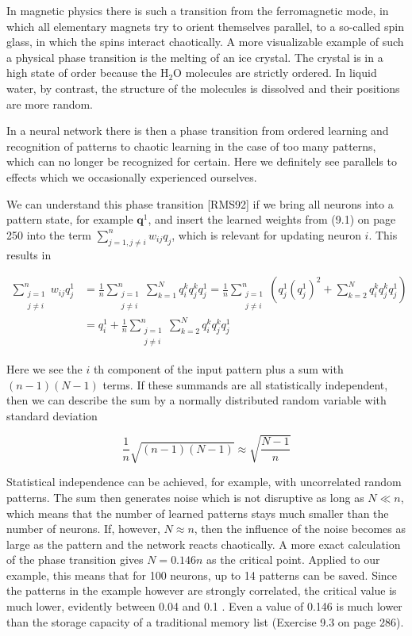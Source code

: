 \documentclass[10pt]{article}
\begin{document}
In magnetic physics there is such a transition from the ferromagnetic mode, in which all elementary magnets try to orient themselves parallel, to a so-called spin glass, in which the spins interact chaotically. A more visualizable example of such a physical phase transition is the melting of an ice crystal. The crystal is in a high state of order because the $\mathrm{H}_{2} \mathrm{O}$ molecules are strictly ordered. In liquid water, by contrast, the structure of the molecules is dissolved and their positions are more random.

In a neural network there is then a phase transition from ordered learning and recognition of patterns to chaotic learning in the case of too many patterns, which can no longer be recognized for certain. Here we definitely see parallels to effects which we occasionally experienced ourselves.

We can understand this phase transition [RMS92] if we bring all neurons into a pattern state, for example $\boldsymbol{q}^{1}$, and insert the learned weights from (9.1) on page 250 into the term $\sum_{j=1, j \neq i}^{n} w_{i j} q_{j}$, which is relevant for updating neuron $i$. This results in

$$
\begin{aligned}
\sum_{\substack{j=1 \\
j \neq i}}^{n} w_{i j} q_{j}^{1} & =\frac{1}{n} \sum_{\substack{j=1 \\
j \neq i}}^{n} \sum_{k=1}^{N} q_{i}^{k} q_{j}^{k} q_{j}^{1}=\frac{1}{n} \sum_{\substack{j=1 \\
j \neq i}}^{n}\left(q_{j}^{1}\left(q_{j}^{1}\right)^{2}+\sum_{k=2}^{N} q_{i}^{k} q_{j}^{k} q_{j}^{1}\right) \\
& =q_{i}^{1}+\frac{1}{n} \sum_{\substack{j=1 \\
j \neq i}}^{n} \sum_{k=2}^{N} q_{i}^{k} q_{j}^{k} q_{j}^{1}
\end{aligned}
$$

Here we see the $i$ th component of the input pattern plus a sum with $(n-1)(N-1)$ terms. If these summands are all statistically independent, then we can describe the sum by a normally distributed random variable with standard deviation

$$
\frac{1}{n} \sqrt{(n-1)(N-1)} \approx \sqrt{\frac{N-1}{n}}
$$

Statistical independence can be achieved, for example, with uncorrelated random patterns. The sum then generates noise which is not disruptive as long as $N \ll n$, which means that the number of learned patterns stays much smaller than the number of neurons. If, however, $N \approx n$, then the influence of the noise becomes as large as the pattern and the network reacts chaotically. A more exact calculation of the phase transition gives $N=0.146 n$ as the critical point. Applied to our example, this means that for 100 neurons, up to 14 patterns can be saved. Since the patterns in the example however are strongly correlated, the critical value is much lower, evidently between 0.04 and 0.1 . Even a value of 0.146 is much lower than the storage capacity of a traditional memory list (Exercise 9.3 on page 286).
\end{document}
